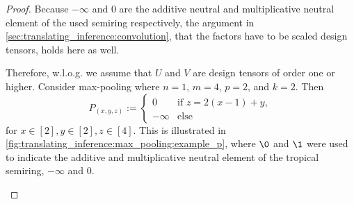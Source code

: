 \begin{proof}
    Because $-\infty$ and $0$ are the additive neutral and multiplicative neutral element of the used semiring respectively,
    the argument in \cref{sec:translating_inference:convolution}, that the factors have to be scaled design tensors, holds here as well.

    Therefore, w.l.o.g. we assume that $U$ and $V$ are design tensors of order one or higher.
    Consider max-pooling where $n = 1$, $m = 4$, $p = 2$, and $k = 2$.
    Then
    $$P_{(x,y,z)} := \begin{cases}
            0       & \text{if $z = 2 (x - 1) + y$}, \\
            -\infty & \text{else}
        \end{cases}$$
    for $x \in [2], y \in [2], z \in [4]$.
    This is illustrated in \cref{fig:translating_inference:max_pooling:example_p}, where $\0$ and $\1$ were used to indicate the additive and multiplicative neutral element of the tropical semiring, $-\infty$ and $0$.
    \begin{figure}
        \centering
\end{figure}
\end{proof}
